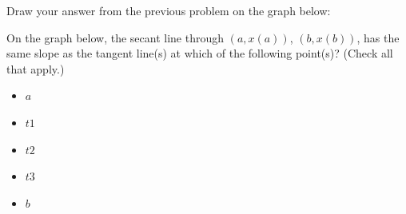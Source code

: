 \documentclass[pdftex, brazil, 12pt, twoside]{article}
\newcommand{\quadrado}{\item[$\square$]}
\begin{document}
\begin{Exercise}[title={Draw your answer, instantaneous rate of change}]
  \noindent Draw your answer from the previous problem on the graph below:
  \begin{figure}[H]
    \begin{center}
      \label{fig:mvt-avgxinst-3}
    \end{center}
  \end{figure}
\end{Exercise}

\begin{Exercise}[title={Comparing average and instantaneous rates of change}]
  \noindent On the graph below, the secant line through $(a, x(a))$, $(b, x(b))$,
  has the same slope as the tangent line(s) at which of the following point(s)?
  (Check all that apply.)
  \begin{figure}[H]
    \begin{center}
      \label{fig:mvt-avgxinst-4}
    \end{center}
  \end{figure}
  \begin{itemize}[noitemsep]
    \quadrado $a$
    \quadrado $t1$
    \quadrado $t2$
    \quadrado $t3$
    \quadrado $b$
  \end{itemize}  
\end{Exercise}
\end{document}
